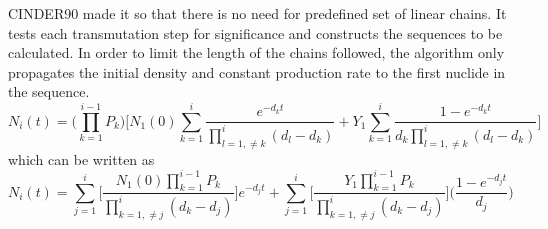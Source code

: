 CINDER90 made it so that there is no need for predefined set
of linear chains. It tests each transmutation step for significance and
constructs the sequences to be calculated. In order to limit the length
of the chains followed, the algorithm only propagates the
initial density and constant production rate to the first nuclide in the sequence.
\begin{equation}\label{eq:bateman_he_1st_n}
  N_{i}(t) =
  \Bigg( \prod_{k=1}^{i-1} P_{k} \Bigg)
  \Bigg[ N_{1}(0) \sum_{k=1}^{i}\frac{e^{-d_{k}t}}{\displaystyle
  \prod_{l=1, \neq k}^{i}(d_{l} -d_{k})}
  + Y_{1}
  \sum_{k=1}^{i} \frac{1 - e^{-d_{k}t}}{d_{k}
  \displaystyle \prod_{l=1, \neq k}^{i}(d_{l} -d_{k})}
  \Bigg]
\end{equation}
which can be written as
\begin{equation}\label{eq:bateman_he_1st_n2}
  N_{i}(t) = \sum_{j=1}^{i}
  \Bigg[ \frac{N_{1}(0) \displaystyle \prod_{k=1}^{i-1} P_{k}}
  {\displaystyle \prod_{k=1, \neq j}^{i}(d_{k} -d_{j})} \Bigg]e^{-d_{j}t} +
  \sum_{j=1}^{i}
  \Bigg [ \frac{Y_{1} \displaystyle \prod_{k=1}^{i-1} P_{k}}
  {\displaystyle \prod_{k=1, \neq j}^{i}(d_{k} -d_{j})} \Bigg]
  \Bigg( \frac{1 - e^{-d_{j}t}}{d_{j}} \Bigg)
\end{equation}
